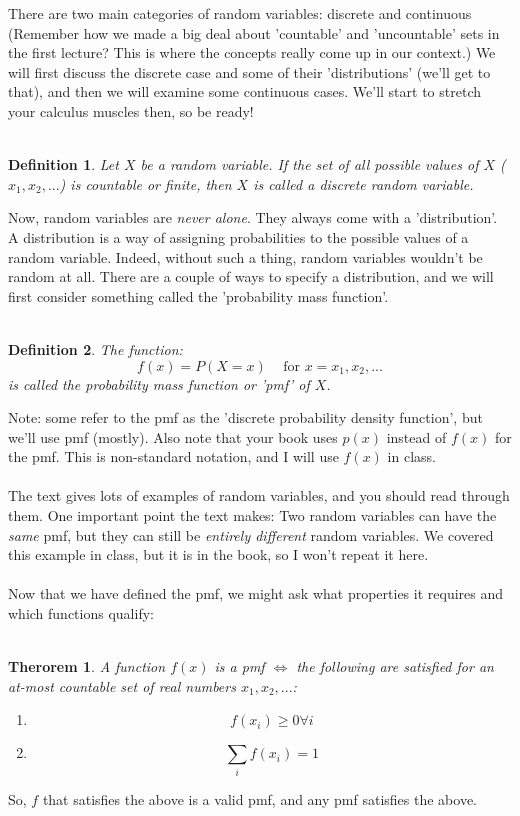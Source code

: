\documentclass[12pt]{article} %
\newtheorem{defn}{Definition}
\newtheorem{thm}{Therorem}
\begin{document}
There are two main categories of random variables: discrete and continuous (Remember how we made a big deal about 'countable' and 'uncountable' sets in the first lecture? This is where the concepts really come up in our context.) We will first discuss the discrete case and some of their 'distributions' (we'll get to that), and then we will examine some continuous cases. We'll start to stretch your calculus muscles then, so be ready!\\\\


\begin{defn}
Let $X$ be a random variable. If the set of all possible values of $X$ ($x_1,x_2,...$) is \emph{countable} or finite, then $X$ is called a \emph{discrete} random variable.
\end{defn}

Now, random variables are \emph{never alone}. They always come with a 'distribution'. A distribution is a way of assigning probabilities to the possible values of a random variable. Indeed, without such a thing, random variables wouldn't be random at all. There are a couple of ways to specify a distribution, and we will first consider something called the 'probability mass function'.\\\\
\begin{defn}
The function:
$$f(x) = P(X=x) \;\;\;\textrm{ for } x = x_1,x_2,...$$
is called the \emph{probability mass function} or 'pmf' of $X$.
\end{defn}
Note: some refer to the pmf as the 'discrete probability density function', but we'll use pmf (mostly). Also note that your book uses $p(x)$ instead of $f(x)$ for the pmf. This is non-standard notation, and I will use $f(x)$ in class.\\\\
The text gives lots of examples of random variables, and you should read through them. One important point the text makes: Two random variables can have the \emph{same} pmf, but they can still be \emph{entirely different} random variables. We covered this example in class, but it is in the book, so  I won't repeat it here.\\\\
Now that we have defined the pmf, we might ask what properties it requires and which functions qualify:\\\\
\newpage
\begin{thm}
A function $f(x)$ is a pmf $\iff$ the following are satisfied for an at-most countable set of real numbers $x_1,x_2,...$:
\begin{enumerate}
\item $$f(x_i)\geq 0 \forall i$$
\item $$\sum_{i}f(x_i) = 1$$
\end{enumerate}
\end{thm}
So, $f$ that satisfies the above is a valid pmf, and any pmf satisfies the above.
\end{document}
